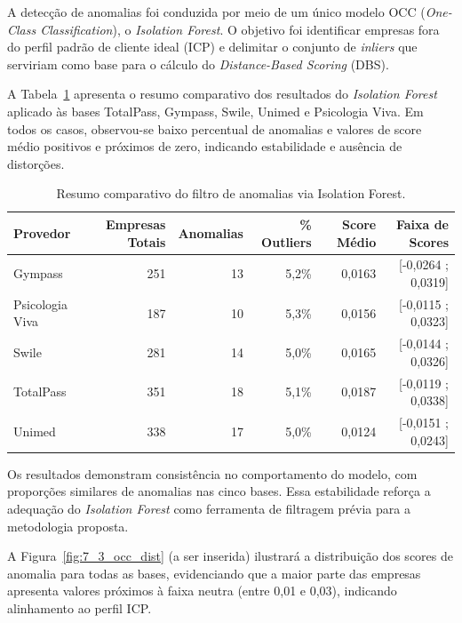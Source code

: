 A detecção de anomalias foi conduzida por meio de um único modelo OCC (\textit{One-Class Classification}), o \textit{Isolation Forest}. O objetivo foi identificar empresas fora do perfil padrão de cliente ideal (ICP) e delimitar o conjunto de \textit{inliers} que serviriam como base para o cálculo do \textit{Distance-Based Scoring} (DBS).

A Tabela~\ref{tab:7_4_occ_all} apresenta o resumo comparativo dos resultados do \textit{Isolation Forest} aplicado às bases TotalPass, Gympass, Swile, Unimed e Psicologia Viva. Em todos os casos, observou-se baixo percentual de anomalias e valores de score médio positivos e próximos de zero, indicando estabilidade e ausência de distorções.

\begin{table}[H]
\centering
\caption{Resumo comparativo do filtro de anomalias via Isolation Forest.}
\label{tab:7_4_occ_all}
\begin{tabular}{lrrrrr}
\toprule
\textbf{Provedor} & \textbf{Empresas Totais} & \textbf{Anomalias} & \textbf{\% Outliers} & \textbf{Score Médio} & \textbf{Faixa de Scores} \\
\midrule
Gympass & 251 & 13 & 5,2\% & 0,0163 & [-0,0264 ; 0,0319] \\
Psicologia Viva & 187 & 10 & 5,3\% & 0,0156 & [-0,0115 ; 0,0323] \\
Swile & 281 & 14 & 5,0\% & 0,0165 & [-0,0144 ; 0,0326] \\
TotalPass & 351 & 18 & 5,1\% & 0,0187 & [-0,0119 ; 0,0338] \\
Unimed & 338 & 17 & 5,0\% & 0,0124 & [-0,0151 ; 0,0243] \\
\bottomrule
\end{tabular}
\end{table}


Os resultados demonstram consistência no comportamento do modelo, com proporções similares de anomalias nas cinco bases. Essa estabilidade reforça a adequação do \textit{Isolation Forest} como ferramenta de filtragem prévia para a metodologia proposta.

A Figura~\ref{fig:7_3_occ_dist} (a ser inserida) ilustrará a distribuição dos scores de anomalia para todas as bases, evidenciando que a maior parte das empresas apresenta valores próximos à faixa neutra (entre 0,01 e 0,03), indicando alinhamento ao perfil ICP.

